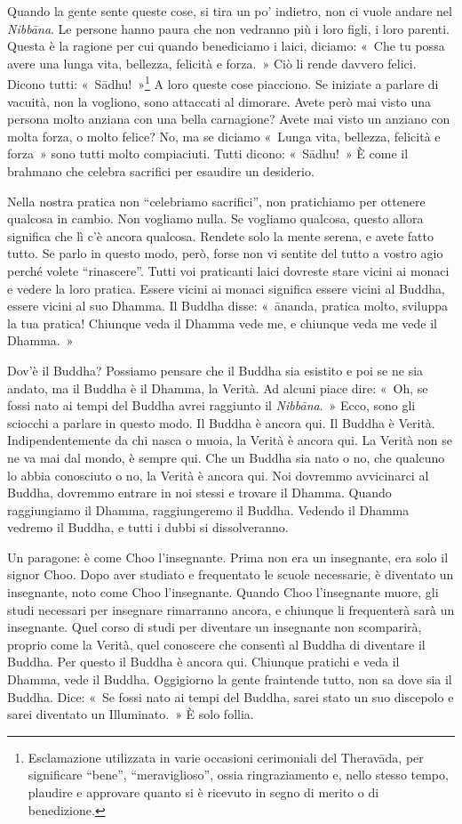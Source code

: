 Quando la gente sente queste cose, si tira un po' indietro, non ci vuole
andare nel \emph{Nibbāna}. Le persone hanno paura che non vedranno più i
loro figli, i loro parenti. Questa è la ragione per cui quando
benediciamo i laici, diciamo: «~Che tu possa avere una lunga vita,
bellezza, felicità e forza.~» Ciò li rende davvero felici. Dicono tutti:
«~Sādhu!~»\footnote{Esclamazione utilizzata in varie occasioni
  cerimoniali del Theravāda, per significare ``bene'', ``meraviglioso'',
  ossia ringraziamento e, nello stesso tempo, plaudire e approvare
  quanto si è ricevuto in segno di merito o di benedizione.} A loro
queste cose piacciono. Se iniziate a parlare di vacuità, non la
vogliono, sono attaccati al dimorare. Avete però mai visto una persona
molto anziana con una bella carnagione? Avete mai visto un anziano con
molta forza, o molto felice? No, ma se diciamo «~Lunga vita, bellezza,
felicità e forza~» sono tutti molto compiaciuti. Tutti dicono:
«~Sādhu!~» È come il brahmano che celebra sacrifici per esaudire un
desiderio.

Nella nostra pratica non ``celebriamo sacrifici'', non pratichiamo per
ottenere qualcosa in cambio. Non vogliamo nulla. Se vogliamo qualcosa,
questo allora significa che lì c'è ancora qualcosa. Rendete solo la
mente serena, e avete fatto tutto. Se parlo in questo modo, però, forse
non vi sentite del tutto a vostro agio perché volete ``rinascere''.
Tutti voi praticanti laici dovreste stare vicini ai monaci e vedere la
loro pratica. Essere vicini ai monaci significa essere vicini al Buddha,
essere vicini al suo Dhamma. Il Buddha disse: «~ānanda, pratica molto,
sviluppa la tua pratica! Chiunque veda il Dhamma vede me, e chiunque
veda me vede il Dhamma.~»

Dov'è il Buddha? Possiamo pensare che il Buddha sia esistito e poi se ne
sia andato, ma il Buddha è il Dhamma, la Verità. Ad alcuni piace dire:
«~Oh, se fossi nato ai tempi del Buddha avrei raggiunto il
\emph{Nibbāna}.~» Ecco, sono gli sciocchi a parlare in questo
modo. Il Buddha è ancora qui. Il Buddha è Verità. Indipendentemente da
chi nasca o muoia, la Verità è ancora qui. La Verità non se ne va mai
dal mondo, è sempre qui. Che un Buddha sia nato o no, che qualcuno lo
abbia conosciuto o no, la Verità è ancora qui. Noi dovremmo avvicinarci
al Buddha, dovremmo entrare in noi stessi e trovare il Dhamma. Quando
raggiungiamo il Dhamma, raggiungeremo il Buddha. Vedendo il Dhamma
vedremo il Buddha, e tutti i dubbi si dissolveranno.

Un paragone: è come Choo l'insegnante. Prima non era un insegnante, era
solo il signor Choo. Dopo aver studiato e frequentato le scuole
necessarie, è diventato un insegnante, noto come Choo l'insegnante.
Quando Choo l'insegnante muore, gli studi necessari per insegnare
rimarranno ancora, e chiunque li frequenterà sarà un insegnante. Quel
corso di studi per diventare un insegnante non scomparirà, proprio come
la Verità, quel conoscere che consentì al Buddha di diventare il Buddha.
Per questo il Buddha è ancora qui. Chiunque pratichi e veda il Dhamma,
vede il Buddha. Oggigiorno la gente fraintende tutto, non sa dove sia il
Buddha. Dice: «~Se fossi nato ai tempi del Buddha, sarei stato un suo
discepolo e sarei diventato un Illuminato.~» È solo follia.

